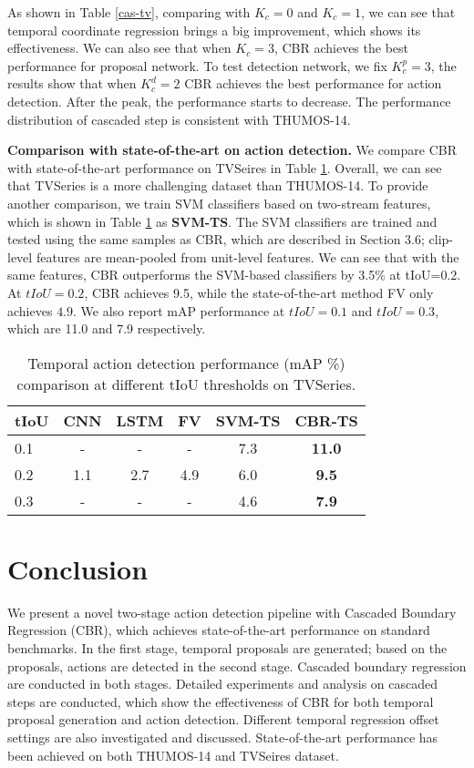 \documentclass{bmvc2k}
\begin{document}
As shown in Table \ref{cas-tv}, comparing with $K_c=0$ and $K_c=1$, we can see that temporal coordinate regression brings a big improvement, which shows its effectiveness. We can also see that when $K_c=3$, CBR achieves the best performance for proposal network. To test detection network, we fix $K_c^p=3$, the results show that when  $K_c^d=2$ CBR achieves the best performance for action detection. After the peak, the performance starts to decrease. The performance distribution of cascaded step is consistent with THUMOS-14.   


\textbf{Comparison with state-of-the-art on action detection.} We compare CBR with state-of-the-art performance on TVSeires in Table \ref{tv-det}. Overall, we can see that TVSeries is a more challenging dataset than THUMOS-14. To provide another comparison, we train SVM classifiers based on two-stream features, which is shown in Table \ref{tv-det} as \textbf{SVM-TS}. The SVM classifiers are trained and tested using the same samples as CBR, which are described in Section 3.6; clip-level features are mean-pooled from unit-level features. We can see that with the same features, CBR outperforms the SVM-based classifiers by 3.5\% at tIoU=0.2.  At $tIoU=0.2$, CBR achieves 9.5, while the state-of-the-art method FV \cite{de2016online} only achieves $4.9$. We also report mAP performance at $tIoU=0.1$ and $tIoU=0.3$, which are 11.0 and 7.9 respectively.

\begin{table}[h]\small
\centering
\caption{Temporal action detection performance (mAP \%) comparison at different tIoU thresholds on TVSeries.}
\label{tv-det}
\begin{tabular}{l|ccccc}
\hline
tIoU     & CNN \cite{de2016online}           & LSTM \cite{de2016online}           & FV  \cite{de2016online}     & SVM-TS & CBR-TS         \\ \hline
 0.1 & -          & -          & -     & 7.3&       \textbf{11.0}     \\ 
 0.2 &1.1          & 2.7          & 4.9   & 6.0 &      \textbf{9.5}     \\ 
  0.3 & -          & -          & -      &4.6 &      \textbf{7.9}    \\ \hline
\end{tabular}
\end{table}

\section{Conclusion}
We present a novel two-stage action detection pipeline with Cascaded Boundary Regression (CBR), which achieves state-of-the-art performance on standard benchmarks. In the first stage, temporal proposals are generated; based on the proposals, actions are detected in the second stage. Cascaded boundary regression are conducted in both stages. Detailed experiments and analysis on cascaded steps are conducted, which show the effectiveness of CBR for both temporal proposal generation and action detection. Different temporal regression offset settings are also investigated and discussed. State-of-the-art performance has been achieved on both THUMOS-14 and TVSeires dataset.


\end{document}
